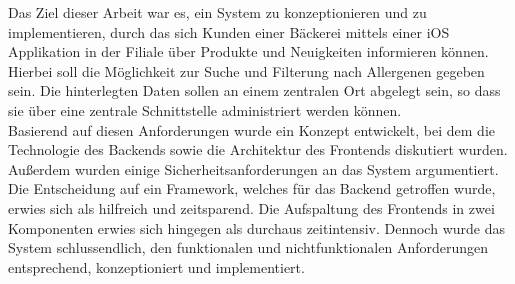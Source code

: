 Das Ziel dieser Arbeit war es, ein System zu konzeptionieren und zu implementieren, durch das sich Kunden einer Bäckerei mittels einer iOS Applikation in der Filiale über Produkte und Neuigkeiten informieren können. Hierbei soll die Möglichkeit zur Suche und Filterung nach Allergenen gegeben sein. Die hinterlegten Daten sollen an einem zentralen Ort abgelegt sein, so dass sie über eine zentrale Schnittstelle administriert werden können.
\\
Basierend auf diesen Anforderungen wurde ein Konzept entwickelt, bei dem die Technologie des Backends sowie die Architektur des Frontends diskutiert wurden. Außerdem wurden einige Sicherheitsanforderungen an das System argumentiert. 
\\
Die Entscheidung auf ein Framework, welches für das Backend getroffen wurde, erwies sich als hilfreich und zeitsparend. Die Aufspaltung des Frontends in zwei Komponenten erwies sich hingegen als durchaus zeitintensiv.
Dennoch wurde das System schlussendlich, den funktionalen und nichtfunktionalen Anforderungen entsprechend, konzeptioniert und implementiert.